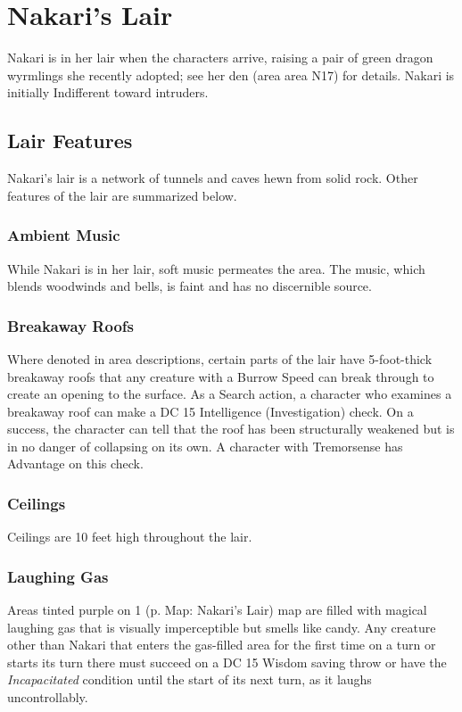 \documentclass[letterpaper, 11pt, twocolumn]{dndbook}
\begin{document}
\section{Nakari's Lair}

Nakari is in her lair when the characters arrive, raising a pair of green dragon wyrmlings she recently adopted; see her den (area area N17) for details. Nakari is initially Indifferent toward intruders.

\subsection{Lair Features}

Nakari's lair is a network of tunnels and caves hewn from solid rock. Other features of the lair are summarized below.

\subsubsection{Ambient Music}

While Nakari is in her lair, soft music permeates the area. The music, which blends woodwinds and bells, is faint and has no discernible source.

\subsubsection{Breakaway Roofs}

Where denoted in area descriptions, certain parts of the lair have 5-foot-thick breakaway roofs that any creature with a Burrow Speed can break through to create an opening to the surface. As a Search action, a character who examines a breakaway roof can make a DC 15 Intelligence (Investigation) check. On a success, the character can tell that the roof has been structurally weakened but is in no danger of collapsing on its own. A character with Tremorsense has Advantage on this check.

\subsubsection{Ceilings}

Ceilings are 10 feet high throughout the lair.

\subsubsection{Laughing Gas}

Areas tinted purple on 1 (p. Map: Nakari's Lair) map are filled with magical laughing gas that is visually imperceptible but smells like candy. Any creature other than Nakari that enters the gas-filled area for the first time on a turn or starts its turn there must succeed on a DC 15 Wisdom saving throw or have the \textit{Incapacitated} condition until the start of its next turn, as it laughs uncontrollably.
\end{document}
